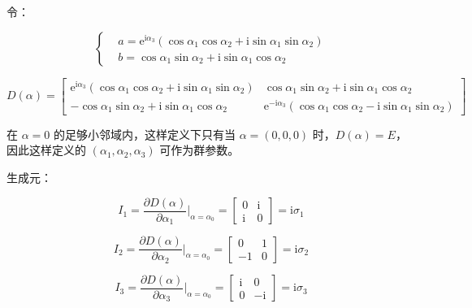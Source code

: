 令：

\begin{equation}
\left\{
\begin{aligned}
&a = \mathrm{e}^{\mathrm{i}\alpha_3}\left(\cos\alpha_1 \cos\alpha_2 + \mathrm{i}\sin\alpha_1\sin\alpha_2 \right) \\
&b = \cos\alpha_1 \sin\alpha_2 + \mathrm{i} \sin\alpha_1 \cos\alpha_2
\end{aligned}
\right.
\end{equation}

\begin{equation}
D\left(\alpha\right)
=\begin{bmatrix}
\mathrm{e}^{\mathrm{i}\alpha_3}\left(\cos\alpha_1 \cos\alpha_2 + \mathrm{i}\sin\alpha_1\sin\alpha_2 \right) &\cos\alpha_1 \sin\alpha_2 + \mathrm{i} \sin\alpha_1 \cos\alpha_2 \\
-\cos\alpha_1 \sin\alpha_2 + \mathrm{i} \sin\alpha_1 \cos\alpha_2 &\mathrm{e}^{-\mathrm{i}\alpha_3}\left(\cos\alpha_1 \cos\alpha_2 - \mathrm{i}\sin\alpha_1\sin\alpha_2 \right)
\end{bmatrix}
\end{equation}

在 $\alpha=0$ 的足够小邻域内，这样定义下只有当 $\alpha = \left(0,0,0\right)$ 时，$D\left(\alpha\right) = E$，因此这样定义的 $\left(\alpha_1,\alpha_2,\alpha_3\right)$ 可作为群参数。

生成元：

\begin{equation}
I_1
=\frac{\partial D\left(\alpha\right) }{\partial \alpha_1 }\bigg|_{\alpha=\alpha_0}
=\begin{bmatrix}
0 &\mathrm{i} \\
\mathrm{i} &0
\end{bmatrix}
=\mathrm{i}\sigma_1
\end{equation}

\begin{equation}
I_2
=\frac{\partial D\left(\alpha\right) }{\partial \alpha_2 }\bigg|_{\alpha=\alpha_0}
=\begin{bmatrix}
0 &1 \\
-1 &0
\end{bmatrix}
=\mathrm{i}\sigma_2
\end{equation}

\begin{equation}
I_3
=\frac{\partial D\left(\alpha\right) }{\partial \alpha_3 }\bigg|_{\alpha=\alpha_0}
=\begin{bmatrix}
\mathrm{i} &0 \\
0 &-\mathrm{i}
\end{bmatrix}
=\mathrm{i}\sigma_3
\end{equation}

